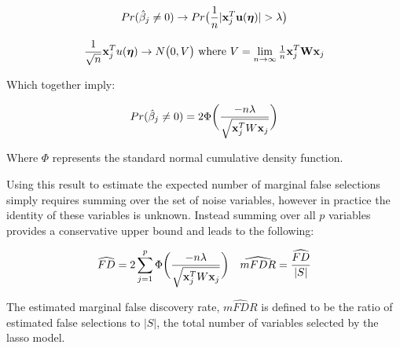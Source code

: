 \begin{equation}
Pr(\hat{\beta}_j \neq 0)  \rightarrow Pr\big(\frac{1}{n}|\mathbf{x}_{j}^T \mathbf{u}(\boldsymbol{\eta})| > \lambda\big)
\end{equation}

\begin{equation}
\frac{1}{\sqrt{n}}\mathbf{x}_{j}^T u(\boldsymbol{\eta}) \rightarrow N\big(0, V\big) 
\text{   where } V = \lim_{n \to \infty} \tfrac{1}{n}\mathbf{x}_{j}^T \mathbf{W} \mathbf{x}_{j}
\end{equation}

Which together imply:

\begin{equation}
Pr(\hat{\beta}_j \neq 0)  = 2\Phi \bigg( \frac{-n\lambda}{\sqrt{ \mathbf{x}_j^TW\mathbf{x}_j}} \bigg)
\end{equation}

Where $\Phi$ represents the standard normal cumulative density function.


Using this result to estimate the expected number of marginal false selections simply requires summing over the set of noise variables, however in practice the identity of these variables is unknown. Instead summing over all $p$ variables provides a conservative upper bound and leads to the following:

\begin{align}
&\widehat{FD} = 2 \sum_{j=1}^{p} \Phi \bigg( \frac{-n\lambda}{\sqrt{\mathbf{x}_j^T W \mathbf{x}_j}} \bigg) & \widehat{mFDR} = \frac{\widehat{FD}}{|S|}
\end{align}

The estimated marginal false discovery rate, $\widehat{mFDR}$ is defined to be the ratio of estimated false selections to $|S|$, the total number of variables selected by the lasso model.


